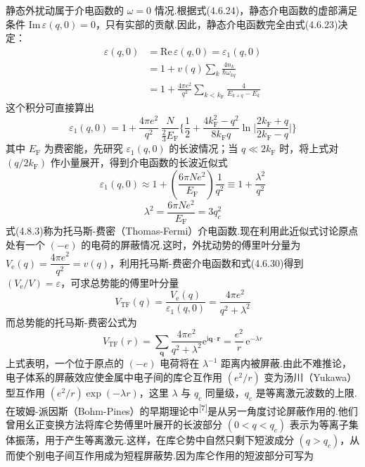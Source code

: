 静态外扰动属于介电函数的 $\omega=0$ 情况.根据式(4.6.24)，静态介电函数的虚部满足条件 $\mathrm{Im}\,\varepsilon(q,0)=0$，只有实部的贡献.因此，静态介电函数完全由式(4.6.23)决定：
\begin{equation}
\begin{aligned}
  \varepsilon(q,0)&=\mathrm{Re}\,\varepsilon(q,0)=\varepsilon_{1}(q,0)\\
  &=1+v(q)\sum_{k}\frac{4n_{k}}{\hbar\omega_{kq}}\\
  &=1+\frac{4\pi e^{2}}{q^{2}}\sum_{k<k_{\mathrm{F}}}
  \frac{4}{E_{k+q}-E_{k}}
\end{aligned}
\end{equation}
这个积分可直接算出
\begin{equation}
  \varepsilon_{1}(q,0)=1+\frac{4\pi e^{2}}{q^{2}}\,
  \frac{N}{\frac{2}{3}E_{\mathrm{F}}}
  \bigg\{\frac{1}{2}+\frac{4k_{\mathrm{F}}^{2}-q^{2}}{8k_{\mathrm{F}}q}
  \ln\bigg|\frac{2k_{\mathrm{F}}+q}{2k_{\mathrm{F}}-q}\bigg|\bigg\}
\end{equation}
其中 $E_{\mathrm{F}}$ 为费密能，先研究 $\varepsilon_{1}(q,0)$ 的长波情况；当 $q\ll 2k_{\mathrm{F}}$ 时，将上式对 $(q/2k_{\mathrm{F}})$ 作小量展开，得到介电函数的长波近似式
\begin{equation}
  \varepsilon_{1}(q,0)\approx 1+\left(\frac{6\pi Ne^{2}}{E_{\mathrm{F}}}\right)\frac{1}{q^{2}}
  \equiv 1+\frac{\lambda^{2}}{q^{2}}
\end{equation}
\begin{equation}
  \lambda^{2}=\frac{6\pi Ne^{2}}{E_{\mathrm{F}}}=3q_{c}^{2}
\end{equation}
式(4.8.3)称为托马斯-费密（Thomas-Fermi）介电函数.现在利用此近似式讨论原点处有一个 $(-e)$ 的电荷的屏蔽情况.这时，外扰动势的傅里叶分量为 $V_{\mathrm{e}}(q)=\dfrac{4\pi e^{2}}{q^{2}}=v(q)$，利用托马斯-费密介电函数和式(4.6.30)得到 $(V_{\mathrm{e}}/V)=\varepsilon$，可求总势能的傅里叶分量
\begin{equation}
  V_{\mathrm{TF}}(q)=\frac{V_{\mathrm{e}}(q)}{\varepsilon_{1}(q,0)}
  =\frac{4\pi e^{2}}{q^{2}+\lambda^{2}}
\end{equation}
而总势能的托马斯-费密公式为
\begin{equation}
  V_{\mathrm{TF}}(r)=\sum_{\boldsymbol{q}}\frac{4\pi e^{2}}{q^{2}+\lambda^{2}}
  \mathrm{e}^{\mathrm{i}\boldsymbol{q}\cdot\boldsymbol{r}}
  =\frac{e^{2}}{r}\,\mathrm{e}^{-\lambda r}
\end{equation}
上式表明，一个位于原点的 $(-e)$ 电荷将在 $\lambda^{-1}$ 距离内被屏蔽.由此不难推论，电子体系的屏蔽效应使金属中电子间的库仑互作用 $(e^{2}/r)$ 变为汤川（Yukawa）型互作用 $(e^{2}/r)\exp(-\lambda r)$，这里 $\lambda$ 与 $q_{c}$ 同量级，$q_{c}$ 是等离激元波数的上限.在玻姆-派因斯（Bohm-Pines）的早期理论中\textsuperscript{[7]}是从另一角度讨论屏蔽作用的.他们曾用幺正变换方法将库仑势傅里叶展开的长波部分 $(0<q<q_{c})$ 表示为等离子集体振荡，用于产生等离激元.这样，在库仑势中自然只剩下短波成分 $(q>q_{c})$，从而使个别电子间互作用成为短程屏蔽势.因为库仑作用的短波部分可写为
